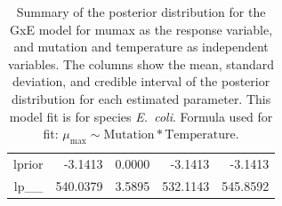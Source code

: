 \begin{table}[ht]
\begin{tabular}{rrrrr}
  lprior & -3.1413 & 0.0000 & -3.1413 & -3.1413 \\ 
  lp\_\_ & 540.0379 & 3.5895 & 532.1143 & 545.8592 \\ 
   \hline
\end{tabular}
\caption{Summary of the posterior distribution for the GxE model for mumax as the response variable, and mutation and temperature as independent variables. The columns show the mean, standard deviation, and credible interval of the posterior distribution for each estimated parameter. This model fit is for species \textit{E.~coli}.  Formula used for fit: $\mu_{\text{max}} \sim \text{Mutation} * \text{Temperature}$.} 
\label{supptab:GxE_mumax_Ecoli}
\end{table}




